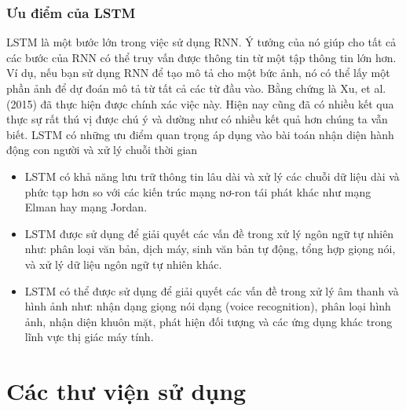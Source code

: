 \subsubsection{Ưu điểm của LSTM}
LSTM là một bước lớn trong việc sử dụng RNN. Ý tưởng của nó giúp cho tất cả các bước của RNN có thể truy vấn được thông tin từ một tập thông tin lớn hơn. Ví dụ, nếu bạn sử dụng RNN để tạo mô tả cho một bức ảnh, nó có thể lấy một phần ảnh để dự đoán mô tả từ tất cả các từ đầu vào. Bằng chứng là Xu, et al. (2015) đã thực hiện được chính xác việc này. Hiện nay cũng đã có nhiều kết qua thực sự rất thú vị được chú ý và dường như có nhiều kết quả hơn chúng ta vẫn biết.
LSTM có những ưu điểm quan trọng áp dụng vào bài toán nhận diện hành động con người và xử lý chuỗi thời gian 
\begin{itemize}
    \item LSTM có khả năng lưu trữ thông tin lâu dài và xử lý các chuỗi dữ liệu dài và phức tạp hơn so với các kiến trúc mạng nơ-ron tái phát khác như mạng Elman hay mạng Jordan.
    \item LSTM được sử dụng để giải quyết các vấn đề trong xử lý ngôn ngữ tự nhiên như: phân loại văn bản, dịch máy, sinh văn bản tự động, tổng hợp giọng nói, và xử lý dữ liệu ngôn ngữ tự nhiên khác.
    \item LSTM có thể được sử dụng để giải quyết các vấn đề trong xử lý âm thanh và hình ảnh như: nhận dạng giọng nói dạng (voice recognition), phân loại hình ảnh, nhận diện khuôn mặt, phát hiện đối tượng và các ứng dụng khác trong lĩnh vực thị giác máy tính.
\end{itemize}

\section{Các thư viện sử dụng}
